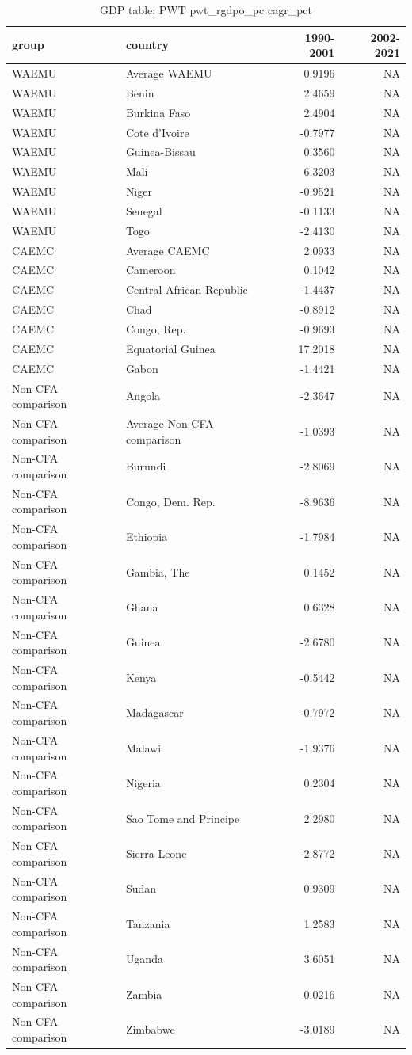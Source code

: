 \begin{table}

\caption{GDP table: PWT pwt_rgdpo_pc cagr_pct}
\centering
\begin{tabular}[t]{llrr}
\toprule
group & country & 1990-2001 & 2002-2021\\
\midrule
WAEMU & Average WAEMU & 0.9196 & NA\\
WAEMU & Benin & 2.4659 & NA\\
WAEMU & Burkina Faso & 2.4904 & NA\\
WAEMU & Cote d'Ivoire & -0.7977 & NA\\
WAEMU & Guinea-Bissau & 0.3560 & NA\\
\addlinespace
WAEMU & Mali & 6.3203 & NA\\
WAEMU & Niger & -0.9521 & NA\\
WAEMU & Senegal & -0.1133 & NA\\
WAEMU & Togo & -2.4130 & NA\\
CAEMC & Average CAEMC & 2.0933 & NA\\
\addlinespace
CAEMC & Cameroon & 0.1042 & NA\\
CAEMC & Central African Republic & -1.4437 & NA\\
CAEMC & Chad & -0.8912 & NA\\
CAEMC & Congo, Rep. & -0.9693 & NA\\
CAEMC & Equatorial Guinea & 17.2018 & NA\\
\addlinespace
CAEMC & Gabon & -1.4421 & NA\\
Non-CFA comparison & Angola & -2.3647 & NA\\
Non-CFA comparison & Average Non-CFA comparison & -1.0393 & NA\\
Non-CFA comparison & Burundi & -2.8069 & NA\\
Non-CFA comparison & Congo, Dem. Rep. & -8.9636 & NA\\
\addlinespace
Non-CFA comparison & Ethiopia & -1.7984 & NA\\
Non-CFA comparison & Gambia, The & 0.1452 & NA\\
Non-CFA comparison & Ghana & 0.6328 & NA\\
Non-CFA comparison & Guinea & -2.6780 & NA\\
Non-CFA comparison & Kenya & -0.5442 & NA\\
\addlinespace
Non-CFA comparison & Madagascar & -0.7972 & NA\\
Non-CFA comparison & Malawi & -1.9376 & NA\\
Non-CFA comparison & Nigeria & 0.2304 & NA\\
Non-CFA comparison & Sao Tome and Principe & 2.2980 & NA\\
Non-CFA comparison & Sierra Leone & -2.8772 & NA\\
\addlinespace
Non-CFA comparison & Sudan & 0.9309 & NA\\
Non-CFA comparison & Tanzania & 1.2583 & NA\\
Non-CFA comparison & Uganda & 3.6051 & NA\\
Non-CFA comparison & Zambia & -0.0216 & NA\\
Non-CFA comparison & Zimbabwe & -3.0189 & NA\\
\bottomrule
\end{tabular}
\end{table}